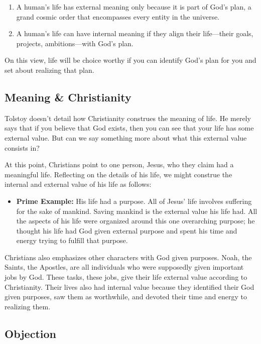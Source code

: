 \documentclass[]{article}
\begin{document}
\begin{enumerate}
\def\labelenumi{\arabic{enumi}.}
\item
  A human's life has external meaning only because it is part of God's
  plan, a grand cosmic order that encompasses every entity in the
  universe.
\item
  A human's life can have internal meaning if they align their
  life---their goals, projects, ambitions---with God's plan.
\end{enumerate}

On this view, life will be choice worthy if you can identify God's plan
for you and set about realizing that plan.

\subsection{Meaning \& Christianity}\label{meaning-christianity}

Tolstoy doesn't detail how Christianity construes the meaning of life.
He merely says that if you believe that God exists, then you can see
that your life has some external value. But can we say something more
about what this external value consists in?

At this point, Christians point to one person, Jesus, who they claim had
a meaningful life. Reflecting on the details of his life, we might
construe the internal and external value of his life as follows:

\begin{itemize}
\itemsep1pt\parskip0pt
\item
  \textbf{Prime Example:} His life had a purpose. All of Jesus' life
  involves suffering for the sake of mankind. Saving mankind is the
  external value his life had. All the aspects of his life were
  organized around this one overarching purpose; he thought his life had
  God given external purpose and spent his time and energy trying to
  fulfill that purpose.
\end{itemize}

Christians also emphasizes other characters with God given purposes.
Noah, the Saints, the Apostles, are all individuals who were supposedly
given important jobs by God. These tasks, these jobs, give their life
external value according to Christianity. Their lives also had internal
value because they identified their God given purposes, saw them as
worthwhile, and devoted their time and energy to realizing them.

\subsection{Objection}\label{objection}
\end{document}

